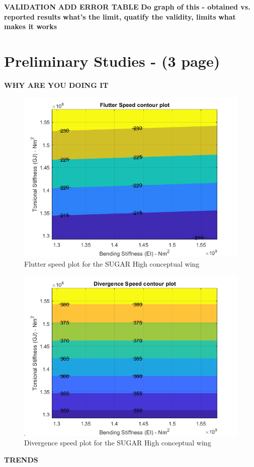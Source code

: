 \documentclass[11pt]{article}
\begin{document}
\textbf{VALIDATION}
\textbf{ADD ERROR TABLE}
\textbf{Do graph of this - obtained vs. reported results}
\textbf{what's the limit, quatify the validity, limits}
\textbf{what makes it works}


\section{Preliminary Studies - (3 page)}
\textbf{WHY ARE YOU DOING IT}
\begin{figure}[H]
    \centering
    \includegraphics[width = .7\textwidth]{figures/SUGAR-High_flutter.png}
    \caption{Flutter speed plot for the SUGAR High conceptual wing}
    \label{fig:SUGAR-flutter}
\end{figure}

\begin{figure}[H]
    \centering
    \includegraphics[width = .7\textwidth]{figures/SUGAR-High_divergence.png}
    \caption{Divergence speed plot for the SUGAR High conceptual wing}
    \label{fig:SUGAR-divergence}
\end{figure}

\textbf{TRENDS}
\end{document}
